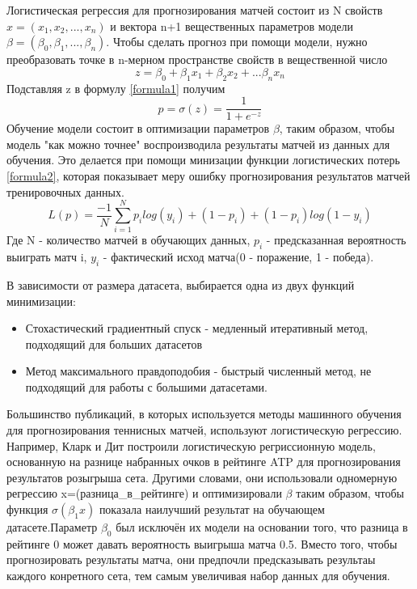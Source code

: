 Логистическая регрессия для прогнозирования матчей состоит из N свойств $x=(x_1,x_2, ..., x_n)$ и вектора
n+1 вещественных параметров модели $\beta=(\beta_0,\beta_1,...,\beta_n)$. Чтобы сделать прогноз при помощи модели, нужно преобразовать точке в n-мерном пространстве свойств  в вещественной число
\begin{equation}
z=\beta_0 +\beta_1x_1+\beta_2x_2+...\beta_nx_n
\end{equation}
Подставляя z в формулу \ref{formula1} получим 
\begin{equation}\label{formula1}
p=\sigma(z)=\frac{1}{1 + e^{-z}}
\end{equation}
Обучение модели состоит в оптимизации параметров $\beta$, таким образом, чтобы модель "как можно точнее" воспроизводила результаты матчей из данных для обучения. Это делается при помощи минизации функции логистических потерь \ref{formula2}, которая показывает меру ошибку прогнозирования результатов матчей тренировочных данных.
\begin{equation}\label{formula2}
L(p)=\frac{-1}{N}\sum_{i=1}^Np_ilog(y_i) + (1 - p_i) + (1 - p_i)log(1-y_i)
\end{equation}
Где N - количество матчей в обучающих данных, $p_i$ - предсказанная вероятность выиграть матч i,  $y_i$ - фактический исход матча(0 - поражение, 1 - победа).

 В зависимости от размера датасета, выбирается одна из двух функций минимизации:
 \begin{itemize}
 	\item Стохастический градиентный спуск - медленный итеративный метод, подходящий для больших датасетов
 	\item Метод максимального правдоподобия - быстрый численный метод, не подходящий для работы с большими датасетами.
 \end{itemize}
Большинство публикаций, в которых используется методы машинного обучения для прогнозирования теннисных матчей, используют логистическую регрессию. Например, Кларк и Дит\cite{Book10} построили логистическую регриссионную модель, основанную на разнице набранных очков в рейтинге ATP для прогнозирования результатов розыгрыша сета. Другими словами, они использовали одномерную регрессию x=(разница\_в\_рейтинге) и оптимизировали $\beta$ таким образом, чтобы функция $\sigma(\beta_1x)$ показала наилучший результат на обучающем датасете.Параметр $\beta_0$ был исключён их модели на основании того, что разница в рейтинге 0 может давать вероятность выигрыша матча 0.5. Вместо того, чтобы прогнозировать результаты матча, они предпочли предсказывать результаы каждого конретного сета, тем самым увеличивая набор данных для обучения.

